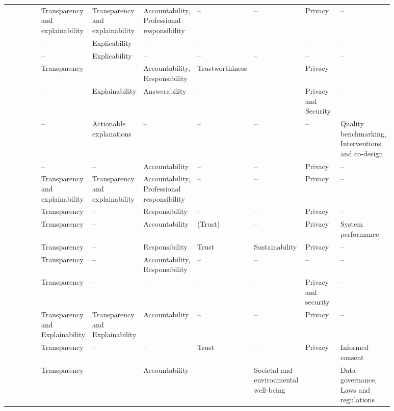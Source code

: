 \begin{landscape}
\begin{ThreePartTable}
\begin{longtable}{P{0.18\linewidth}P{0.1\linewidth}P{0.1\linewidth}P{0.12\linewidth}P{0.08\linewidth}P{0.1\linewidth}P{0.1\linewidth}P{0.1\linewidth}}
        \textcite{Fjeld_2020} & Transparency and explainability & Transparency and explainability & Accountability, \mbox{Professional} \mbox{responsibility} & -- & -- & Privacy & -- \\ 
        \textcite{Floridi_2018} & -- & Explicability & -- & -- & -- & -- & -- \\ 
        \textcite{Floridi_2019} & -- & Explicability & -- & -- & -- & -- & -- \\ 
        \textcite{Gianni_2022} & Transparency & -- & Accountability, \mbox{Responsibility} & Trust\-worthiness & -- & Privacy & -- \\ 
        \textcite{Gupta_2021} & -- & Explainability & Answerability & -- & -- & Privacy and \mbox{Security} & -- \\ 
        \textcite{Hacker_2022} & -- & Actionable \mbox{explanations} & -- & -- & -- & -- & Quality benchmarking, \mbox{Interventions} and co-design \\ 
        \textcite{Hagendorff_2020} & -- & -- & Accountability & -- & -- & Privacy & -- \\ 
        \textcite{Havrda_2020} & Transparency and explainability & Transparency and explainability & Accountability, \mbox{Professional} \mbox{responsibility} & -- & -- & Privacy & -- \\ 
        \textcite{Henriksen_2021} & Transparency & -- & Responsibility & -- & -- & Privacy & -- \\ 
        \textcite{Jakesch_2022} & Transparency & -- & Accountability & (Trust)\tnote{*} & -- & Privacy & System \mbox{performance} \\ 
        \textcite{Jobin_2019} & Transparency & -- & Responsibility & Trust & Sustainability & Privacy & -- \\ 
        \textcite{Kumar_2021} & Transparency & -- & Accountability, \mbox{Responsibility} & -- & -- & -- & -- \\ 
        \textcite{Liu_2021} & Transparency & -- & -- & -- & -- & Privacy and \mbox{security} & -- \\ 
        \textcite{Lu_2022} & Transparency and Explainability & Transparency and Explainability & Accountability & -- & -- & Privacy & -- \\ 
        \textcite{Lukkien_2021} & Transparency & -- & -- & Trust & -- & Privacy & Informed consent \\ 
        \textcite{Merhi_2022} & Transparency & -- & Accountability & -- & Societal and \mbox{environmental} well-being & -- & Data \mbox{governance}, Laws and \mbox{regulations} \\ 

\end{longtable}
\end{ThreePartTable}
\end{landscape}
